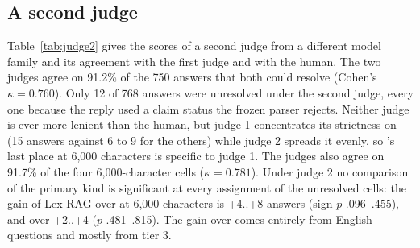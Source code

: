 \subsection{A second judge}
Table~\ref{tab:judge2} gives the scores of a second judge from a different model family and its agreement with the first judge and with the human. The two judges agree on 91.2\% of the 750 answers that both could resolve (Cohen's $\kappa=0.760$). Only 12 of 768 answers were unresolved under the second judge, every one because the reply used a claim status the frozen parser rejects. Neither judge is ever more lenient than the human, but judge 1 concentrates its strictness on \setr{} (15 answers against 6 to 9 for the others) while judge 2 spreads it evenly, so \setr's last place at 6,000 characters is specific to judge 1. The judges also agree on 91.7\% of the four 6,000-character cells ($\kappa=0.781$). Under judge 2 no comparison of the primary kind is significant at every assignment of the unresolved cells: the gain of Lex-RAG over \hybrid{} at 6,000 characters is +4..+8 answers (sign $p$ .096--.455), and over \hr{} +2..+4 ($p$ .481--.815). The gain over \hybrid{} comes entirely from English questions and mostly from tier 3.


